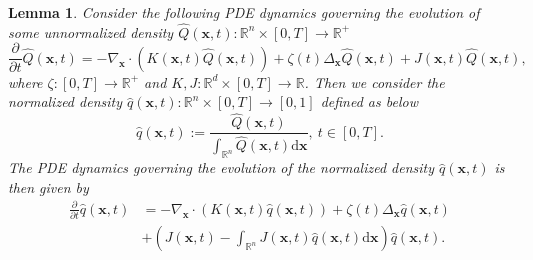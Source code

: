 \documentclass{article}
\numberwithin{equation}{section}
\newtheorem{lemma}[theorem]{Lemma}
\newcommand{\dif}{{\mathrm{d}}}
\def\vx{{\bm{x}}}
\begin{document}
\begin{lemma}
    \label{lem: normalizing linear term in dynamics}
    Consider the following PDE dynamics governing the evolution of some unnormalized density $\widehat{Q}(\vx,t):\mathbb{R}^n \times [0, T] \rightarrow \mathbb{R}^{+}$
    \begin{equation}
    \label{eqn: pde unnormalized in lemma}
    \frac{\partial}{\partial t}\widehat{Q}(\vx,t) = -\nabla_{\vx} \cdot \left(K(\vx,t)\widehat{Q}(\vx,t)\right) + \zeta(t)\Delta_{\vx}\widehat{Q}(\vx,t) + J(\vx,t)\widehat{Q}(\vx,t),
    \end{equation}
    where $\zeta:[0,T] \rightarrow \mathbb{R}^{+}$ and $K, J:\mathbb{R}^{d} \times [0,T] \rightarrow \mathbb{R}$. Then we consider the normalized density $\widehat{q}(\vx,t) : \mathbb{R}^n \times [0,T] \rightarrow [0,1]$ defined as below
    \begin{equation}
    \widehat{q}(\vx,t) := \frac{\widehat{Q}(\vx,t)}{\int_{\mathbb{R}^n}\widehat{Q}(\vx,t)\dif \vx}, \ t \in [0,T].    
    \end{equation}
    The PDE dynamics governing the evolution of the normalized density $\widehat{q}(\vx,t)$ is then given by
    \begin{equation}
    \label{eqn: pde normalized in lemma}
    \begin{aligned}
    \frac{\partial}{\partial t}\widehat{q}(\vx,t) &= -\nabla_{\vx} \cdot \left(K(\vx,t)\widehat{q}(\vx,t)\right) + \zeta(t)\Delta_{\vx}\widehat{q}(\vx,t) \\
    &+ \left(J(\vx,t) - \int_{\mathbb{R}^n}J(\vx,t)\widehat{q}(\vx,t)\dif \vx\right)\widehat{q}(\vx,t).
    \end{aligned}
    \end{equation}
\end{lemma}
\end{document}
